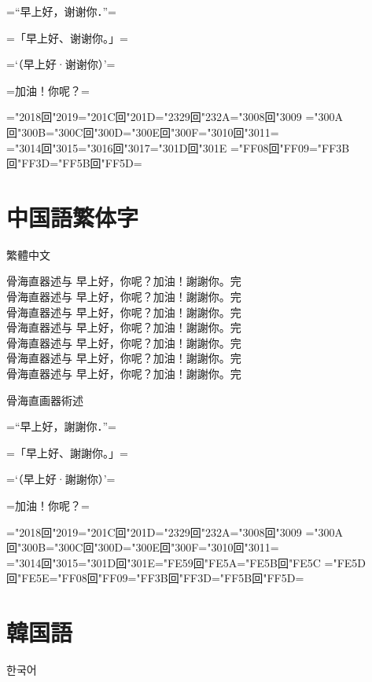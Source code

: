 \documentclass{ujarticle}
\begin{document}
\upschrmm
=“早上好，谢谢你．”=

=「早上好、谢谢你。」=

=‘（早上好·谢谢你）’=

=加油！你呢？=

=\kchar"2018回\kchar"2019=\kchar"201C回\kchar"201D=\kchar"2329回\kchar"232A=\kchar"3008回\kchar"3009%
=\kchar"300A回\kchar"300B=\kchar"300C回\kchar"300D=\kchar"300E回\kchar"300F=\kchar"3010回\kchar"3011=\\
=\kchar"3014回\kchar"3015=\kchar"3016回\kchar"3017=\kchar"301D回\kchar"301E%
=\kchar"FF08回\kchar"FF09=\kchar"FF3B回\kchar"FF3D=\kchar"FF5B回\kchar"FF5D=

\newpage

\section{中国語繁体字}
\upschgtb 繁體中文

\uptchrml 骨海直器述与 早上好，你呢？加油！謝謝你。完\\
\uptchrmm 骨海直器述与 早上好，你呢？加油！謝謝你。完\\
\uptchrmb 骨海直器述与 早上好，你呢？加油！謝謝你。完\\
\uptchgtm 骨海直器述与 早上好，你呢？加油！謝謝你。完\\
\uptchgtb 骨海直器述与 早上好，你呢？加油！謝謝你。完\\
\uptchgte 骨海直器述与 早上好，你呢？加油！謝謝你。完\\
\uptchgth 骨海直器述与 早上好，你呢？加油！謝謝你。完\\

\uptchrmm

骨海直画器術述

=“早上好，謝謝你．”=

=「早上好、謝謝你。」=

=‘（早上好·謝謝你）’=

=加油！你呢？=

=\kchar"2018回\kchar"2019=\kchar"201C回\kchar"201D=\kchar"2329回\kchar"232A=\kchar"3008回\kchar"3009%
=\kchar"300A回\kchar"300B=\kchar"300C回\kchar"300D=\kchar"300E回\kchar"300F=\kchar"3010回\kchar"3011=\\
=\kchar"3014回\kchar"3015=\kchar"301D回\kchar"301E=\kchar"FE59回\kchar"FE5A=\kchar"FE5B回\kchar"FE5C%
=\kchar"FE5D回\kchar"FE5E=\kchar"FF08回\kchar"FF09=\kchar"FF3B回\kchar"FF3D=\kchar"FF5B回\kchar"FF5D=

\section{韓国語}
\upkorgtb 한국어
\end{document}
